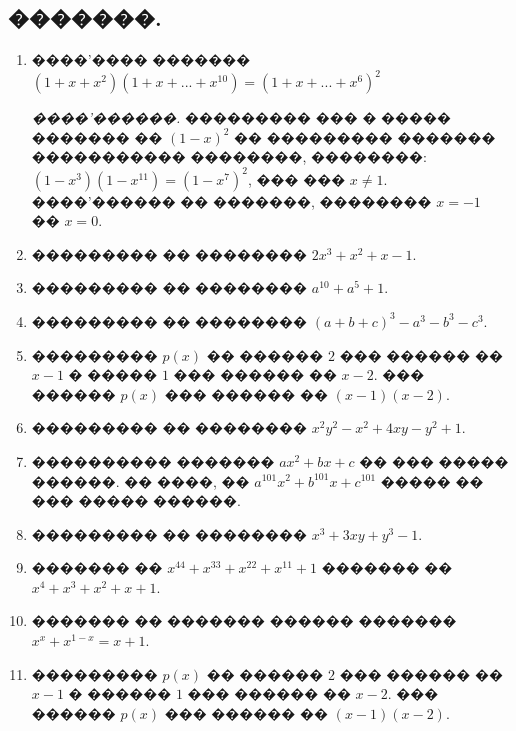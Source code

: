 \documentclass[a4paper,12pt]{article}
\begin{document}
\newpage

\begin{center}
\section*{�������.}
\end{center}

\medskip\medskip\medskip

\begin{enumerate}
\item ����'���� ������� $(1+x+x^{2})(1+x+...+x^{10})=(1+x+...+x^{6})^{2}$

\textit{����'������.} ��������� ��� � ����� ������� �� $(1-x)^{2}$ �� ��������� ������� ����������� ��������, ��������: $(1-x^{3})(1-x^{11})=(1-x^{7})^{2}$, ��� ��� $x\neq 1$. ����'������ �� �������, ��������  $x=-1$ �� $x=0$.

\item ��������� �� �������� $2x^{3}+x^{2}+x-1$.

\item ��������� �� �������� $a^{10}+a^{5}+1$.

\item ��������� �� �������� $(a+b+c)^{3}-a^{3}-b^{3}-c^{3}$.

\item ��������� $p(x)$ �� ������ $2$ ��� ������ �� $x-1$ � ����� $1$ ��� ������ �� $x-2$. ��� ������ $p(x)$ ��� ������ �� $(x-1)(x-2)$.

\item ��������� �� �������� $x^{2}y^{2}-x^{2}+4xy-y^{2}+1$.

\item ���������� ������� $ax^{2}+bx+c$ �� ��� ����� ������. �� ����, �� $a^{101}x^{2}+b^{101}x+c^{101}$ ����� �� ��� ����� ������.

\item ��������� �� �������� $x^{3}+3xy+y^{3}-1$.

\item ������� �� $x^{44}+x^{33}+x^{22}+x^{11}+1$ ������� �� $x^{4}+x^{3}+x^{2}+x+1$.

\item ������� �� ������� ������ ������� $x^{x}+x^{1-x}=x+1$.

\item ��������� $p(x)$ �� ������ $2$ ��� ������ �� $x-1$ � ������ $1$ ��� ������ �� $x-2$. ��� ������ $p(x)$ ��� ������ �� $(x-1)(x-2)$.
\end{enumerate}
\end{document}
